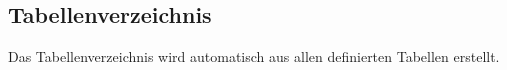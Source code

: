 \subsection{Tabellenverzeichnis}\label{sec:}

Das Tabellenverzeichnis wird automatisch aus allen definierten Tabellen erstellt.
